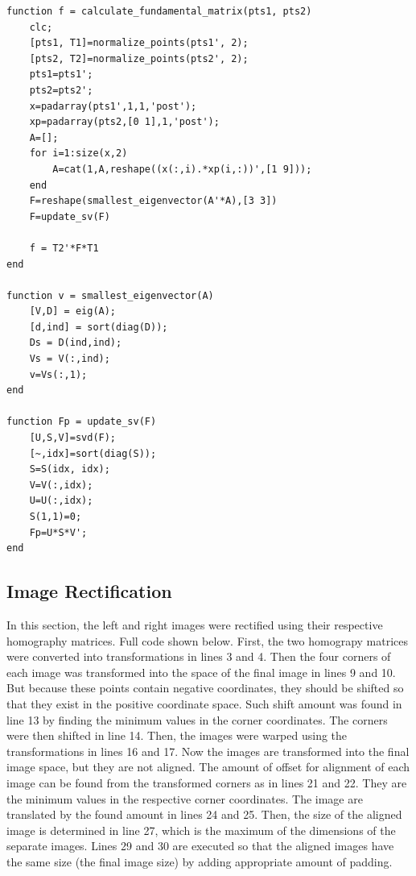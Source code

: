 \begin{lstlisting}[style=Matlab-editor]
function f = calculate_fundamental_matrix(pts1, pts2)
    clc;
    [pts1, T1]=normalize_points(pts1', 2);
    [pts2, T2]=normalize_points(pts2', 2);
    pts1=pts1';
    pts2=pts2';
    x=padarray(pts1',1,1,'post');
    xp=padarray(pts2,[0 1],1,'post');
    A=[];
    for i=1:size(x,2)
        A=cat(1,A,reshape((x(:,i).*xp(i,:))',[1 9]));
    end
    F=reshape(smallest_eigenvector(A'*A),[3 3])
    F=update_sv(F)
    
    f = T2'*F*T1
end

function v = smallest_eigenvector(A)
    [V,D] = eig(A);
    [d,ind] = sort(diag(D));
    Ds = D(ind,ind);
    Vs = V(:,ind);
    v=Vs(:,1);
end

function Fp = update_sv(F)
    [U,S,V]=svd(F);
    [~,idx]=sort(diag(S));
    S=S(idx, idx);
    V=V(:,idx);
    U=U(:,idx);
    S(1,1)=0;
    Fp=U*S*V';
end
\end{lstlisting}


\subsection{Image Rectification}
In this section, the left and right images were rectified using their respective homography matrices. Full code shown below. First, the two homograpy matrices were converted into transformations in lines 3 and 4. Then the four corners of each image was transformed into the space of the final image in lines 9 and 10. But because these points contain negative coordinates, they should be shifted so that they exist in the positive coordinate space. Such shift amount was found in line 13 by finding the minimum values in the corner coordinates. The corners were then shifted in line 14. Then, the images were warped using the transformations in lines 16 and 17. Now the images are transformed into the final image space, but they are not aligned. The amount of offset for alignment of each image can be found from the transformed corners as in lines 21 and 22. They are the minimum values in the respective corner coordinates. The image are translated by the found amount in lines 24 and 25. Then, the size of the aligned image is determined in line 27, which is the maximum of the dimensions of the separate images. Lines 29 and 30 are executed so that the aligned images have the same size (the final image size) by adding appropriate amount of padding. 

